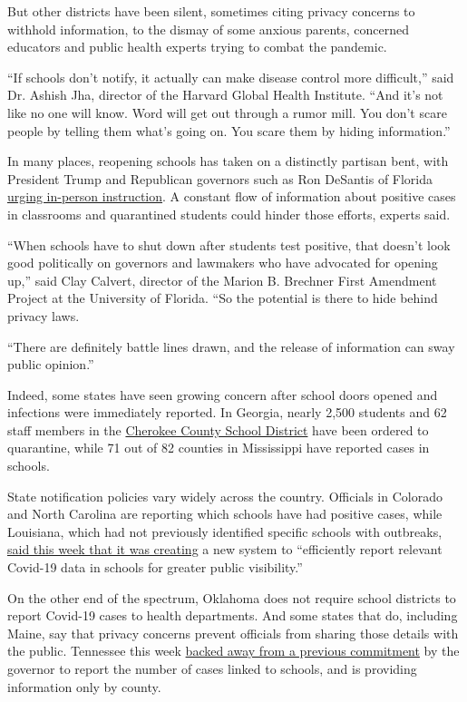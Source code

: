 But other districts have been silent, sometimes citing privacy concerns
to withhold information, to the dismay of some anxious parents,
concerned educators and public health experts trying to combat the
pandemic.

``If schools don't notify, it actually can make disease control more
difficult,'' said Dr. Ashish Jha, director of the Harvard Global Health
Institute. ``And it's not like no one will know. Word will get out
through a rumor mill. You don't scare people by telling them what's
going on. You scare them by hiding information.''

In many places, reopening schools has taken on a distinctly partisan
bent, with President Trump and Republican governors such as Ron DeSantis
of Florida
\href{https://www.nytimes3xbfgragh.onion/2020/08/19/us/coronavirus-schools-florida-local-control.html}{urging
in-person instruction}. A constant flow of information about positive
cases in classrooms and quarantined students could hinder those efforts,
experts said.

``When schools have to shut down after students test positive, that
doesn't look good politically on governors and lawmakers who have
advocated for opening up,'' said Clay Calvert, director of the Marion B.
Brechner First Amendment Project at the University of Florida. ``So the
potential is there to hide behind privacy laws.

``There are definitely battle lines drawn, and the release of
information can sway public opinion.''

Indeed, some states have seen growing concern after school doors opened
and infections were immediately reported. In Georgia, nearly 2,500
students and 62 staff members in the
\href{https://www.nytimes3xbfgragh.onion/2020/08/12/us/georgia-school-coronavirus.html}{Cherokee
County School District} have been ordered to quarantine, while 71 out of
82 counties in Mississippi have reported cases in schools.

State notification policies vary widely across the country. Officials in
Colorado and North Carolina are reporting which schools have had
positive cases, while Louisiana, which had not previously identified
specific schools with outbreaks,
\href{https://www.theadvocate.com/baton_rouge/news/coronavirus/article_07f9a972-e25a-11ea-b188-778b27f6ef01.html}{said
this week that it was creating} a new system to ``efficiently report
relevant Covid-19 data in schools for greater public visibility.''

On the other end of the spectrum, Oklahoma does not require school
districts to report Covid-19 cases to health departments. And some
states that do, including Maine, say that privacy concerns prevent
officials from sharing those details with the public. Tennessee this
week
\href{https://www.tennessean.com/story/news/education/2020/08/18/tennessee-refuses-release-information-covid-19-cases-schools/3394684001/}{backed
away from a previous commitment} by the governor to report the number of
cases linked to schools, and is providing information only by county.


